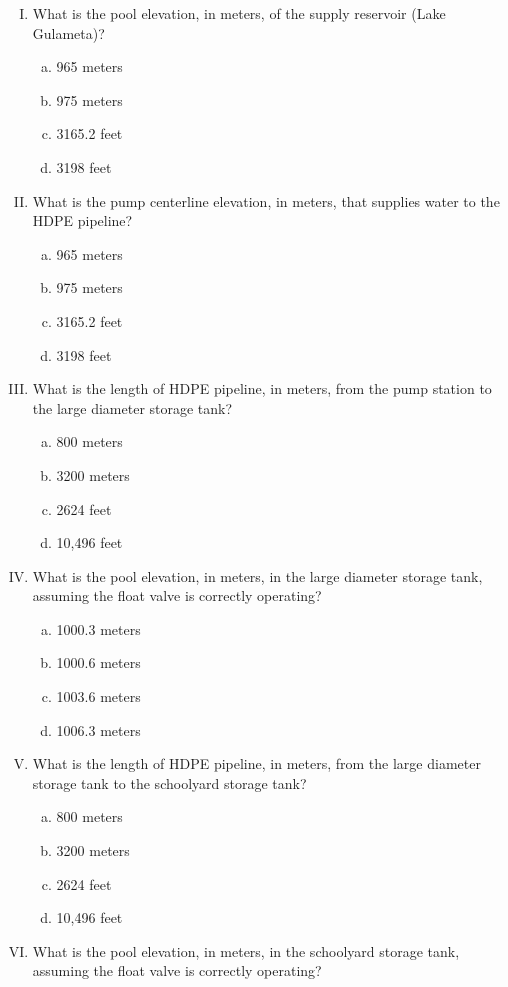 \documentclass[11pt]{article}
\begin{document}
\begin{enumerate}
\begin{enumerate}[(I)]
\item What is the pool elevation, in meters, of the supply reservoir (Lake Gulameta)? 
\begin{enumerate}[a)]
\item 965 meters
\item 975 meters
\item 3165.2 feet
\item 3198 feet
\end{enumerate}
\item What is the pump centerline elevation, in meters, that supplies water to the HDPE pipeline?
\begin{enumerate}[a)]
\item 965 meters
\item 975 meters
\item 3165.2 feet
\item 3198 feet
\end{enumerate}
\item What is the length of HDPE pipeline, in meters, from the pump station to the large diameter storage tank?
\begin{enumerate}[a)]
\item 800 meters
\item 3200 meters
\item 2624 feet
\item 10,496 feet
\end{enumerate}
\item What is the pool elevation, in meters, in the large diameter storage tank, assuming the float valve is correctly operating?
\begin{enumerate}[a)]
\item 1000.3 meters
\item 1000.6 meters
\item 1003.6 meters
\item 1006.3 meters
\end{enumerate}
\item What is the length of HDPE pipeline, in meters, from the large diameter storage tank to the schoolyard storage tank?
\begin{enumerate}[a)]
\item 800 meters
\item 3200 meters
\item 2624 feet
\item 10,496 feet
\end{enumerate}
\item What is the pool elevation, in meters, in the schoolyard storage tank, assuming the float valve is correctly operating?

\end{enumerate}
\end{enumerate}
\end{document}
